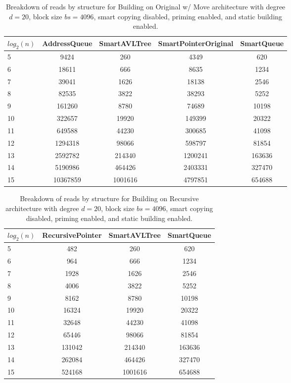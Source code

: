 \begin{table}[]
\centering
\begin{tabular}{|l|c|c|c|c|}
$log_2(n)$ & AddressQueue & SmartAVLTree & SmartPointerOriginal & SmartQueue \\ \hline
5 & 9424 & 260 & 4349 & 620 \\ \hline
6 & 18611 & 666 & 8635 & 1234 \\ \hline
7 & 39041 & 1626 & 18138 & 2546 \\ \hline
8 & 82535 & 3822 & 38293 & 5252 \\ \hline
9 & 161260 & 8780 & 74689 & 10198 \\ \hline
10 & 322657 & 19920 & 149399 & 20322 \\ \hline
11 & 649588 & 44230 & 300685 & 41098 \\ \hline
12 & 1294318 & 98066 & 598797 & 81854 \\ \hline
13 & 2592782 & 214340 & 1200241 & 163636 \\ \hline
14 & 5190986 & 464426 & 2403331 & 327470 \\ \hline
15 & 10367859 & 1001616 & 4797851 & 654688 \\ \hline
\end{tabular}
\caption{Breakdown of reads by structure for Building on Original w/ Move architecture with degree $d=20$, block size $bs=4096$, smart copying disabled, priming enabled, and static building enabled.}
    \label{tab:reads_by_structure_build_d20_bs4096_copiesfalse_primetrue_staticinsertiontrue_ptoriginal_movetrue}
\end{table}

\begin{table}[]
\centering
\begin{tabular}{|l|c|c|c|}
$log_2(n)$ & RecursivePointer & SmartAVLTree & SmartQueue \\ \hline
5 & 482 & 260 & 620 \\ \hline
6 & 964 & 666 & 1234 \\ \hline
7 & 1928 & 1626 & 2546 \\ \hline
8 & 4006 & 3822 & 5252 \\ \hline
9 & 8162 & 8780 & 10198 \\ \hline
10 & 16324 & 19920 & 20322 \\ \hline
11 & 32648 & 44230 & 41098 \\ \hline
12 & 65446 & 98066 & 81854 \\ \hline
13 & 131042 & 214340 & 163636 \\ \hline
14 & 262084 & 464426 & 327470 \\ \hline
15 & 524168 & 1001616 & 654688 \\ \hline
\end{tabular}
\caption{Breakdown of reads by structure for Building on Recursive architecture with degree $d=20$, block size $bs=4096$, smart copying disabled, priming enabled, and static building enabled.}
    \label{tab:reads_by_structure_build_d20_bs4096_copiesfalse_primetrue_staticinsertiontrue_ptrecursive_movetrue}
\end{table}

